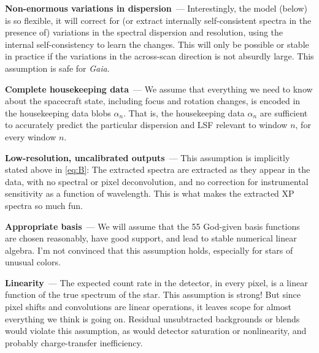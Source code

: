 \documentclass[11pt]{article}
\renewcommand{\paragraph}[1]{\medskip\par\noindent\textbf{#1}~---}
\begin{document}
\paragraph{Non-enormous variations in dispersion}
Interestingly, the model (below) is so flexible, it will correct for (or extract internally self-consistent spectra in the presence of) variations in the spectral dispersion and resolution, using the internal self-consistency to learn the changes.
This will only be possible or stable in practice if the variations in the across-scan direction is not absurdly large.
This assumption is safe for \textsl{Gaia}.

\paragraph{Complete housekeeping data}
We assume that everything we need to know about the spacecraft state, including focus and rotation changes, is encoded in the housekeeping data blobs $\alpha_n$.
That is, the housekeeping data $\alpha_n$ are sufficient to accurately predict the particular dispersion and LSF relevant to window $n$, for every window $n$.

\paragraph{Low-resolution, uncalibrated outputs}
This assumption is implicitly stated above in \eqref{eq:B}:
The extracted spectra are extracted as they appear in the data, with no spectral or pixel deconvolution, and no correction for instrumental sensitivity as a function of wavelength.
This is what makes the extracted XP spectra so much fun.

\paragraph{Appropriate basis}
We will assume that the 55 God-given basis functions are chosen reasonably, have good support, and lead to stable numerical linear algebra.
I'm not convinced that this assumption holds, especially for stars of unusual colors.

\paragraph{Linearity}
The expected count rate in the detector, in every pixel, is a linear function of the true spectrum of the star.
This assumption is strong!
But since pixel shifts and convolutions are linear operations, it leaves scope for almost everything we think is going on.
Residual unsubtracted backgrounds or blends would violate this assumption, as would detector saturation or nonlinearity, and probably charge-transfer inefficiency.
\end{document}
